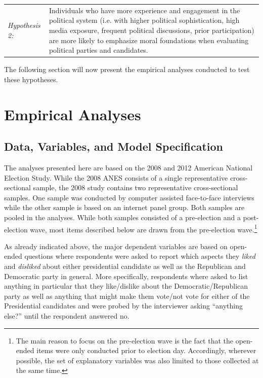 \documentclass[12pt]{article}
\begin{document}
%
%

\vspace{0.3cm}
\begin{tabular}{lp{12cm}}
\textsl{Hypothesis 2:} & Individuals who have more experience and engagement in the political system (i.e. with higher political sophistication, high media exposure, frequent political discussions, prior participation) are more likely to emphasize moral foundations when evaluating political parties and candidates.
\end{tabular}
\vspace{0.5cm}

The following section will now present the empirical analyses conducted to test these hypotheses.


\section{Empirical Analyses}

\subsection{Data, Variables, and Model Specification}

The analyses presented here are based on the 2008 and 2012 American National Election Study. While the 2008 ANES consists of a single representative cross-sectional sample, the 2008 study contains two representative cross-sectional samples. One sample was conducted by computer assisted face-to-face interviews while the other sample is based on an internet panel group. Both samples are pooled in the analyses. While both samples consisted of a pre-election and a post-election wave, most items described below are drawn from the pre-election wave.\footnote{The main reason to focus on the pre-election wave is the fact that the open-ended items were only conducted prior to election day. Accordingly, wherever possible, the set of explanatory variables was also limited to those collected at the same time.}

As already indicated above, the major dependent variables are based on open-ended questions where respondents were asked to report which aspects they \textit{liked} and \textit{disliked} about either presidential candidate as well as the Republican and Democratic party in general. More specifically, respondents where asked to list anything in particular that they like/dislike about the Democratic/Republican party as well as anything that might make them vote/not vote for either of the Presidential candidates and were probed by the interviewer asking ``anything else?'' until the respondent answered no.
\end{document}
